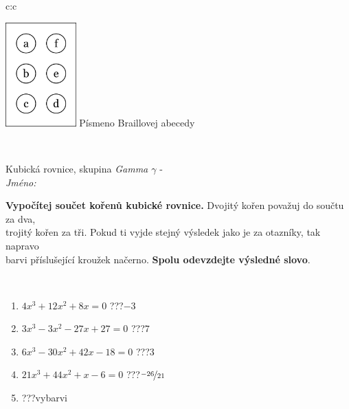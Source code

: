 \documentclass[10pt]{report}
\begin{document}
\begin{tabular}{c:c}
\begin{minipage}[c][104.5mm][t]{0.5\linewidth}
\begin{center}
\begin{minipage}{0.20\linewidth}
\begin{center}
\includegraphics[height=40mm]{../images/braille.png}
{\small Písmeno Braillovej abecedy}
\end{center}
\end{minipage}
\end{center}
\end{minipage}
\\ \hdashline
\begin{minipage}[c][104.5mm][t]{0.5\linewidth}
\begin{center}
\vspace{7mm}
{\huge Kubická rovnice, skupina \textit{Gamma $\gamma$} -}\\[5mm]
\textit{Jméno:}\phantom{xxxxxxxxxxxxxxxxxxxxxxxxxxxxxxxxxxxxxxxxxxxxxxxxxxxxxxxxxxxxxxxxx}\\[5mm]
\begin{minipage}{0.95\linewidth}
\begin{center}
\textbf{Vypočítej součet kořenů kubické rovnice.} Dvojitý kořen považuj do součtu za dva,\\trojitý kořen za tři. Pokud ti vyjde stejný výsledek jako je za otazníky, tak napravo\\barvi příslušející kroužek načerno. \textbf{Spolu odevzdejte výsledné slovo}.
\end{center}
\end{minipage}
\\[1mm]
\begin{minipage}{0.79\linewidth}
\begin{center}
\begin{varwidth}{\linewidth}
\begin{enumerate}
\Large
\item $4x^3+12x^2+8x=0$\quad \dotfill\; ???\;\dotfill \quad $-3$
\item $3x^3-3x^2-27x+27=0$\quad \dotfill\; ???\;\dotfill \quad $7$
\item $6x^3-30x^2+42x-18=0$\quad \dotfill\; ???\;\dotfill \quad $3$
\item $21x^3+44x^2+x-6=0$\quad \dotfill\; ???\;\dotfill \quad $\nicefrac{-26}{21}$
\item \quad \dotfill\; ???\;\dotfill \quad vybarvi

\end{enumerate}
\end{varwidth}
\end{center}
\end{minipage}
\end{center}
\end{minipage}
\end{tabular}
\end{document}
